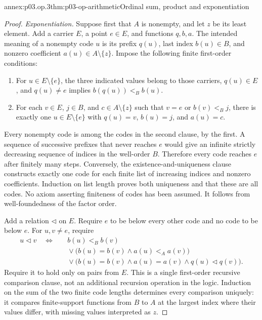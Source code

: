 \begin{annexitem}{annex:p03.op.3}{thm:p03-op-arithmetic}{Ordinal sum, product and exponentiation}
\begin{proof}
\emph{Exponentiation.} Suppose first that \(A\) is nonempty,
and let \(z\) be its least element. Add a carrier \(E\), a
point \(e\in E\), and functions \(q,b,a\). The intended
meaning of a nonempty code \(u\) is its prefix \(q(u)\),
last index \(b(u)\in B\), and nonzero coefficient
\(a(u)\in A\setminus\{z\}\). Impose the following finite
first-order conditions:
\begin{enumerate}
\item For \(u\in E\setminus\{e\}\), the three indicated
values belong to those carriers, \(q(u)\in E\), and
\(q(u)\ne e\) implies \(b(q(u))<_{B}b(u)\).
\item For each \(v\in E\), \(j\in B\), and
\(c\in A\setminus\{z\}\) such that
\(v=e\) or \(b(v)<_{B}j\), there is exactly one
\(u\in E\setminus\{e\}\) with
\(q(u)=v\), \(b(u)=j\), and \(a(u)=c\).
\end{enumerate}
Every nonempty code is among the codes in the second clause,
by the first. A sequence of successive prefixes that never
reaches \(e\) would give an infinite strictly decreasing
sequence of indices in the well-order \(B\). Therefore every
code reaches \(e\) after finitely many steps. Conversely,
the existence-and-uniqueness clause constructs exactly one
code for each finite list of increasing indices and nonzero
coefficients. Induction on list length proves both uniqueness
and that these are all codes. No axiom asserting finiteness of
codes has been assumed. It follows from well-foundedness of
the factor order.

Add a relation \(\lhd\) on \(E\). Require \(e\) to be
below every other code and no code to be below \(e\).
For \(u,v\ne e\), require
\[
\begin{aligned}
 u\lhd v\quad\Longleftrightarrow\quad& b(u)<_{B}b(v)\\
 &{}\lor\bigl(b(u)=b(v)\land a(u)<_{A}a(v)\bigr)\\
 &{}\lor\bigl(b(u)=b(v)\land a(u)=a(v)
                          \land q(u)\lhd q(v)\bigr).
\end{aligned}
\]
Require it to hold only on pairs from \(E\). This is a single
first-order recursive comparison clause, not an additional
recursion operation in the logic. Induction on the sum of the
two finite code lengths determines every comparison uniquely:
it compares finite-support functions from \(B\) to \(A\)
at the largest index where their values differ, with missing
values interpreted as \(z\).


\end{proof}
\end{annexitem}
